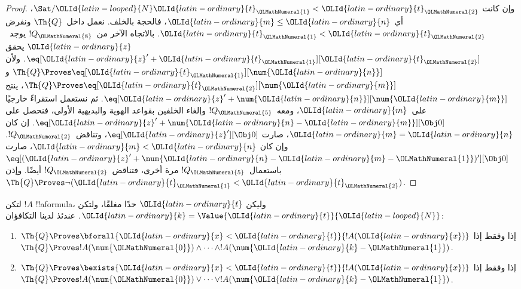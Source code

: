 \documentclass[../../../include/open-logic-section]{subfiles}
\begin{document}
\begin{proof}
وإن كانت $\Sat/{{\OLId{latin-looped}{N}}}{{\OLId{latin-ordinary}{t}}_{\OLMathNumeral{1}}<{\OLId{latin-ordinary}{t}}_{\OLMathNumeral{2}}}$، أي ${\OLId{latin-ordinary}{m}}\leq {\OLId{latin-ordinary}{n}}$، فالحجة بالخلف.
%
نعمل داخل~$\Th{Q}$ ونفرض ${\OLId{latin-ordinary}{t}}_{\OLMathNumeral{1}}<{\OLId{latin-ordinary}{t}}_{\OLMathNumeral{2}}$.
بالاتجاه الآخر من~$!Q_{\OLMathNumeral{8}}$ يوجد~${\OLId{latin-ordinary}{z}}$ يحقق $\eq[{\OLId{latin-ordinary}{z}}'+{\OLId{latin-ordinary}{t}}_{\OLMathNumeral{1}}][{\OLId{latin-ordinary}{t}}_{\OLMathNumeral{2}}]$.
ولأن $\Th{Q}\Proves\eq[{\OLId{latin-ordinary}{t}}_{\OLMathNumeral{1}}][\num {\OLId{latin-ordinary}{n}}]$
و$\Th{Q}\Proves\eq[{\OLId{latin-ordinary}{t}}_{\OLMathNumeral{2}}][\num {\OLId{latin-ordinary}{m}}]$، ينتج
$\eq[{\OLId{latin-ordinary}{z}}'+\num {\OLId{latin-ordinary}{n}}][\num {\OLId{latin-ordinary}{m}}]$.
%
ثم نستعمل استقراءً خارجيًا على~${\OLId{latin-ordinary}{m}}$، ومعه~$!Q_{\OLMathNumeral{5}}$ وإلغاء الخلفين بقواعد
الهوية والبديهية الأولى، فنحصل على
$\eq[{\OLId{latin-ordinary}{z}}'+\num{{\OLId{latin-ordinary}{n}}-{\OLId{latin-ordinary}{m}}}][\Obj 0]$.
إن كان ${\OLId{latin-ordinary}{m}}={\OLId{latin-ordinary}{n}}$، صارت $\eq[{\OLId{latin-ordinary}{z}}'][\Obj 0]$، وتناقض~$!Q_{\OLMathNumeral{2}}$.
وإن كان ${\OLId{latin-ordinary}{m}}<{\OLId{latin-ordinary}{n}}$، صارت
$\eq[({\OLId{latin-ordinary}{z}}'+\num{{\OLId{latin-ordinary}{n}}-{\OLId{latin-ordinary}{m}}-{\OLMathNumeral{1}}})'][\Obj 0]$ باستعمال~$!Q_{\OLMathNumeral{5}}$ مرة أخرى،
فتناقض~$!Q_{\OLMathNumeral{2}}$ أيضًا. وإذن $\Th{Q}\Proves\lnot({\OLId{latin-ordinary}{t}}_{\OLMathNumeral{1}}<{\OLId{latin-ordinary}{t}}_{\OLMathNumeral{2}})$.
\end{proof}

\begin{lem}
لتكن $!A$ !!a{formula}، وليكن ${\OLId{latin-ordinary}{t}}$ حدًا مغلقًا،
ولتكن ${\OLId{latin-ordinary}{k}}=\Value{{\OLId{latin-ordinary}{t}}}{{\OLId{latin-looped}{N}}}$. عندئذ لدينا التكافؤان:
\begin{enumerate}
\item $\Th{Q}\Proves\bforall{{\OLId{latin-ordinary}{x}}<{\OLId{latin-ordinary}{t}}}{!A({\OLId{latin-ordinary}{x}})}$ إذا وفقط إذا
    $\Th{Q}\Proves !A(\num {\OLMathNumeral{0}})\land\dots\land !A(\num{{\OLId{latin-ordinary}{k}}-{\OLMathNumeral{1}}})$.
\item $\Th{Q}\Proves\bexists{{\OLId{latin-ordinary}{x}}<{\OLId{latin-ordinary}{t}}}{!A({\OLId{latin-ordinary}{x}})}$ إذا وفقط إذا
    $\Th{Q}\Proves !A(\num {\OLMathNumeral{0}})\lor\dots\lor !A(\num{{\OLId{latin-ordinary}{k}}-{\OLMathNumeral{1}}})$.
\end{enumerate}
\end{lem}
\end{document}
